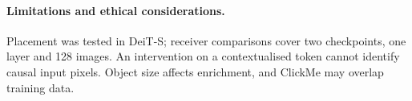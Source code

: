 \documentclass{article}
\begin{document}
\paragraph{Limitations and ethical considerations.} Placement was tested in DeiT-S; receiver comparisons cover two checkpoints, one layer and 128 images. An intervention on a contextualised token cannot identify causal input pixels. Object size affects enrichment, and ClickMe may overlap training data.

\label{main:end}
\clearpage
{\small\setlength{\bibsep}{2pt}}
\clearpage\appendix

\end{document}
